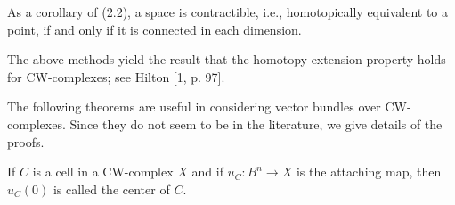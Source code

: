 As a corollary of (2.2), a space is contractible, i.e., homotopically equivalent to a point, if and only if it is connected in each dimension.

The above methods yield the result that the homotopy extension property holds for CW-complexes; see Hilton [1, p. 97].

The following theorems are useful in considering vector bundles over CW-complexes. Since they do not seem to be in the literature, we give details of the proofs.

If $C$ is a cell in a CW-complex $X$ and if $u_C: B^n \rightarrow X$ is the attaching map, then $u_C(0)$ is called the center of $C$.
